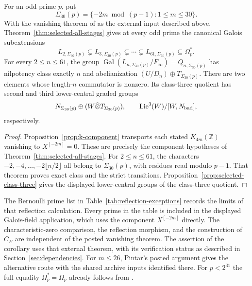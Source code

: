 \begin{corollary}
\label{cor:k-canonical-detection}
For an odd prime $p$, put
\[
 \Sigma_{30}(p)=\{-2m\bmod(p-1):1\leq m\leq30\}.
\]
With the vanishing theorem of \cite[Theorem~1, p.~2]{MZ} as the
external input described above, Theorem~\ref{thm:selected-all-stages}
gives at every odd prime the canonical Galois subextensions
\[
 L_{2,\Sigma_{30}(p)}\subsetneq L_{3,\Sigma_{30}(p)}
 \subsetneq\cdots\subsetneq L_{61,\Sigma_{30}(p)}
 \subseteq\Omega_p^*.
\]
For every \(2\leq n\leq61\), the group
\(\operatorname{Gal}(L_{n,\Sigma_{30}(p)}/F_\infty)=Q_{n,\Sigma_{30}(p)}\)
has nilpotency class exactly \(n\) and abelianization
\((U/D_n)\oplus T_{\Sigma_{30}(p)}\).
There are two elements whose length-\(n\) commutator is nonzero.
Its class-three quotient has second and third lower-central
graded groups
\[
 N_{\Sigma_{30}(p)}\oplus(W\widehat\otimes T_{\Sigma_{30}(p)}),
 \qquad \operatorname{Lie}^3(W)/[W,N_{\rm bad}],
\]
respectively.
\end{corollary}
\begin{proof}
Proposition~\ref{prop:k-component} transports each stated
$K_{4m}(\mathbb Z)$ vanishing to $X^{[-2m]}=0$.
These are precisely the component hypotheses of
Theorem~\ref{thm:selected-all-stages}. For \(2\leq n\leq61\),
the characters \(-2,-4,\ldots,-2\lfloor n/2\rfloor\) all belong
to \(\Sigma_{30}(p)\), with residues read modulo \(p-1\).
That theorem proves exact class and the strict transitions.
Proposition~\ref{prop:selected-class-three} gives the displayed
lower-central groups of the class-three quotient.
\end{proof}
The Bernoulli prime list in Table~\ref{tab:reflection-exceptions}
records the limits of that reflection calculation. Every prime
in the table is included in the displayed Galois-field application,
which uses the component $X^{[-2m]}$ directly.
The characteristic-zero comparison, the reflection morphism,
and the construction of $C_E$ are independent of the posted
vanishing theorem. The assertion of the corollary uses that
external theorem, with its verification status as described in
Section~\ref{sec:dependencies}. For $m\leq26$, Pintar's posted
argument gives the alternative route with the shared archive
inputs identified there. For $p<2^{31}$ the full equality
$\Omega_p^*=\Omega_p$ already follows from \cite{HHO,Note}.


